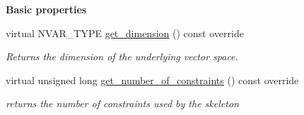 \begin{Indent}\textbf{ Basic properties}\par
\begin{DoxyCompactItemize}
\item 
\mbox{\label{group___c_l_s_solvers_a5a5f372696416caeae454ce78e9acb86}} 
virtual N\+V\+A\+R\+\_\+\+T\+Y\+PE \hyperlink{group___c_l_s_solvers_a5a5f372696416caeae454ce78e9acb86}{get\+\_\+dimension} () const override
\begin{DoxyCompactList}\small\item\em Returns the dimension of the underlying vector space. \end{DoxyCompactList}\item 
virtual unsigned long \hyperlink{group___c_l_s_solvers_afb7f014f84eb37026fe26f8c3114c0f0}{get\+\_\+number\+\_\+of\+\_\+constraints} () const override
\begin{DoxyCompactList}\small\item\em returns the number of constraints used by the skeleton \end{DoxyCompactList}\end{DoxyCompactItemize}
\end{Indent}
